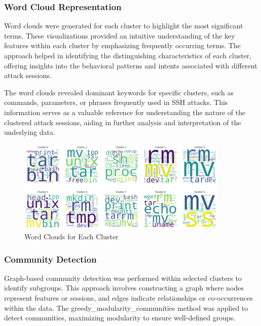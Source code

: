         \subsubsection{Word Cloud Representation \\}

            Word clouds were generated for each cluster to highlight the most significant terms. These visualizations provided an intuitive understanding of the key features within each cluster by emphasizing frequently occurring terms. The approach helped in identifying the distinguishing characteristics of each cluster, offering insights into the behavioral patterns and intents associated with different attack sessions.

            The word clouds revealed dominant keywords for specific clusters, such as commands, parameters, or phrases frequently used in SSH attacks. This information serves as a valuable reference for understanding the nature of the clustered attack sessions, aiding in further analysis and interpretation of the underlying data.

            \begin{figure}[H]
                \centering
                \includegraphics[width=0.9\textwidth]{../figures/plots/section3/circular_wordclouds.png}
                \caption{Word Clouds for Each Cluster}
                \label{fig:word_clouds}
            \end{figure}
            
            \subsubsection{Community Detection \\}
            
                Graph-based community detection was performed within selected clusters to identify subgroups. This approach involves constructing a graph where nodes represent features or sessions, and edges indicate relationships or co-occurrences within the data. The greedy\_modularity\_communities method was applied to detect communities, maximizing modularity to ensure well-defined groups.

